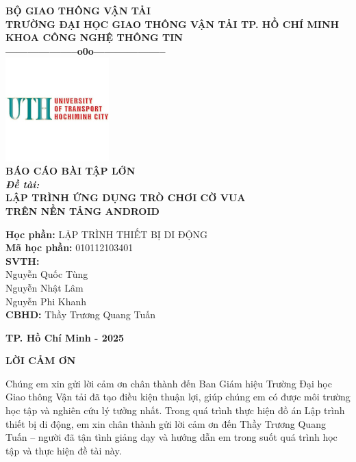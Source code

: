 \documentclass[a4paper,12pt]{article}
\begin{document}
\thispagestyle{empty}
\begin{center}
  \textbf{BỘ GIAO THÔNG VẬN TẢI}\\
  \textbf{TRƯỜNG ĐẠI HỌC GIAO THÔNG VẬN TẢI TP. HỒ CHÍ MINH}\\
  \textbf{KHOA CÔNG NGHỆ THÔNG TIN}\\
  \textbf{--------------------o0o--------------------}\\[1.5cm]

  \includegraphics[width=0.3\textwidth]{img/logo_uth.png}\\[1.5cm]

  \textbf{\LARGE BÁO CÁO BÀI TẬP LỚN}\\[1cm]
  \textbf{\large \textit{Đề tài:}}\\[0.5cm]
  \textbf{\Large LẬP TRÌNH ỨNG DỤNG TRÒ CHƠI CỜ VUA}\\[0.2cm]
  \textbf{\Large TRÊN NỀN TẢNG ANDROID}\\[1cm]

  \begin{flushleft}
    \textbf{\large Học phần:} LẬP TRÌNH THIẾT BỊ DI ĐỘNG\\[0.5cm]
    \textbf{\large Mã học phần:} 010112103401\\[1cm]
    \hspace{5cm}\textbf{\large SVTH:}\\
    \hspace{5cm} Nguyễn Quốc Tùng\\
    \hspace{5cm} Nguyễn Nhật Lâm\\
    \hspace{5cm} Nguyễn Phi Khanh\\[1cm]
    \hspace{5cm}\textbf{\large CBHD:} Thầy Trương Quang Tuấn\\[2cm]
  \end{flushleft}

  \textbf{TP. Hồ Chí Minh - 2025}
\end{center}

\newpage
\thispagestyle{empty}
\begin{center}
  \textbf{\Large LỜI CẢM ƠN}
\end{center}
\onehalfspacing
\justify
\noindent Chúng em xin gửi lời cảm ơn chân thành đến Ban Giám hiệu Trường Đại học Giao thông Vận tải đã tạo điều kiện thuận lợi, giúp chúng em có được môi trường học tập và nghiên cứu lý tưởng nhất. Trong quá trình thực hiện đồ án Lập trình thiết bị di động, em xin chân thành gửi lời cảm ơn đến Thầy Trương Quang Tuấn – người đã tận tình giảng dạy và hướng dẫn em trong suốt quá trình học tập và thực hiện đề tài này.
\end{document}
